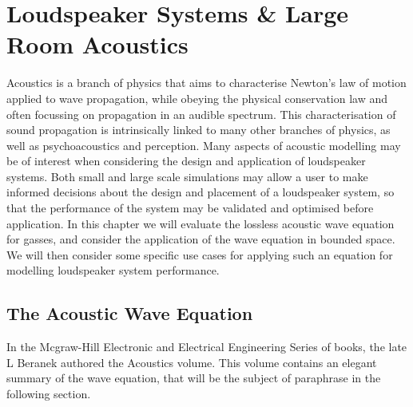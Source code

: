 %
%
%
\chapter{Loudspeaker Systems \& Large Room Acoustics}
\label{Introduction}
Acoustics is a branch of physics that aims to characterise Newton's law of motion applied to wave propagation, while obeying the physical conservation law and often focussing on propagation in an audible spectrum. This characterisation of sound propagation is intrinsically linked to many other branches of physics, as well as psychoacoustics and perception. Many aspects of acoustic modelling may be of interest when considering the design and application of loudspeaker systems. Both small and large scale simulations may allow a user to make informed decisions about the design and placement of a loudspeaker system, so that the performance of the system may be validated and optimised before application. In this chapter we will evaluate the lossless acoustic wave equation for gasses, and consider the application of the wave equation in bounded space. We will then consider some specific use cases for applying such an equation for modelling loudspeaker system performance.

\section{The Acoustic Wave Equation}

In the Mcgraw-Hill Electronic and Electrical Engineering Series of books, the late L Beranek authored the Acoustics volume. This volume contains an elegant summary of the wave equation, that will be the subject of paraphrase in the following section.


